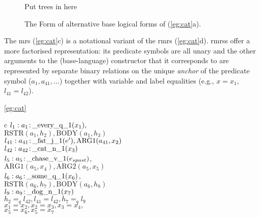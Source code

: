 \begin{figure}[h]

Put trees in here

\caption{The Form of alternative base logical forms of
  (\ref{eg:cat}a).}
\label{fig:1}
\end{figure}

The {\sc mrs} (\ref{eg:cat}c) is a notational variant of the {\sc
  rmrs} (\ref{eg:cat}d). {\sc rmrs}s offer a more factorised
representation: its predicate symbols are all unary and the other
arguments to the (base-language) constructor that it corresponds to
are represented by separate binary relations on the unique {\em
  anchor} of the predicate symbol ($a_1, a_{41},\ldots$) together with
variable and label equalities (e.g., $x=x_1$, $l_{41}=l_{42}$).
\begin{examples}
\item   [\ref{eg:cat}]
\begin{subexamples}
\item   [c]
$l_1:a_1\colon\!\mbox{\_every\_q\_1}(x_1),$\\
\hspace*{0.1in}$\mbox{RSTR}(a_1,h_2),
\mbox{BODY}(a_1,h_3)$\\ 
$l_{41}:a_{41}\colon\!\mbox{\_fat\_j\_1}(e'), \mbox{ARG1}(a_{41},x_2)$\\
$l_{42}:a_{42}\colon\!\mbox{\_cat\_n\_1}(x_3)$\\
$l_5:a_5\colon\!\mbox{\_chase\_v\_1}(e_{spast})$,\\
\hspace*{0.1in}$\mbox{ARG1}(a_5,x_4),
\mbox{ARG2}(a_5,x_5)$\\ 
$l_6:a_6\colon\!\mbox{\_some\_q\_1}(x_6)$,\\
\hspace*{0.1in}$\mbox{RSTR}(a_6,h_7),
\mbox{BODY}(a_6,h_8)$\\ 
$l_9:a_9\colon\!\mbox{\_dog\_n\_1}(x_7)$\\
$h_2=_q l_{42}, l_{41}=l_{42}, h_7 =_q l_9$\\
$x_1=x_2, x_2=x_3, x_3=x_4,$\\
$x_5=x_6, x_5=x_7$
\end{subexamples}
\end{examples}

